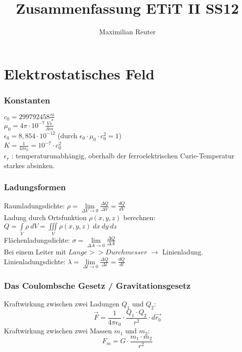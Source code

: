 \documentclass[12pt,a4paper]{article}
\author{Maximilian Reuter}
\title{Zusammenfassung ETiT II SS12}
\begin{document}
\maketitle
\tableofcontents
\newpage
\part{Elektrostatisches Feld}

\section{Konstanten}

$c_0 = 299 792 458 \frac{m}{s}$\\
$\mu_0 = 4\pi \cdot 10^{-7} \frac{Vs}{Am}$\\
$\epsilon_0 = 8,854 \cdot 10^{-12}$ (durch $\epsilon_0 \cdot \mu_0 \cdot c^2_0 = 1$)\\
$K = \frac{1}{4\pi\epsilon_0} = 10^{-7} \cdot c^2_0$\\
$\epsilon_r$ : temperaturunabhängig, oberhalb der ferroelektrischen Curie-Temperatur starkes absinken.\\
\section{Ladungsformen}

Raumladungsdichte: $\rho = \lim\limits_{\Delta V \to 0} {\frac{\Delta Q}{\Delta V} = \frac{dQ}{dV}}$\\
Ladung durch Ortsfunktion $\rho(x,y,z)$ berechnen: $Q = \int\limits_V {\rho\ dV} = \iiint\limits_V{\rho(x,y,z)\ dx\ dy\ dz}$\\
Flächenladungsdichte: $\sigma = \lim\limits_{\Delta A \to 0}{\frac{\Delta Q}{\Delta A}}$\\
Bei einem Leiter mit $Lange >> Durchmesser$ $\rightarrow$ Linienladung.\\
Linienladungsdichte: $\lambda = \lim\limits_{\Delta l \to 0}{\frac{\Delta Q}{\Delta l}} = \frac{dQ}{dl}$

\section{Das Coulombsche Gesetz / Gravitationsgesetz}
Kraftwirkung zwischen zwei Ladungen $Q_1$ und $Q_2$: \[\vec{F} = \frac{1}{4\pi \epsilon_0}\cdot \frac{Q_1 \cdot Q_2}{r^2}\cdot d\vec{r_{0}}\]
Kraftwirkung zwischen zwei Massen $m_1$ und $m_2$: \[F_m = G\cdot \frac{m_1 \cdot m_2}{r^2}\]
\end{document}
